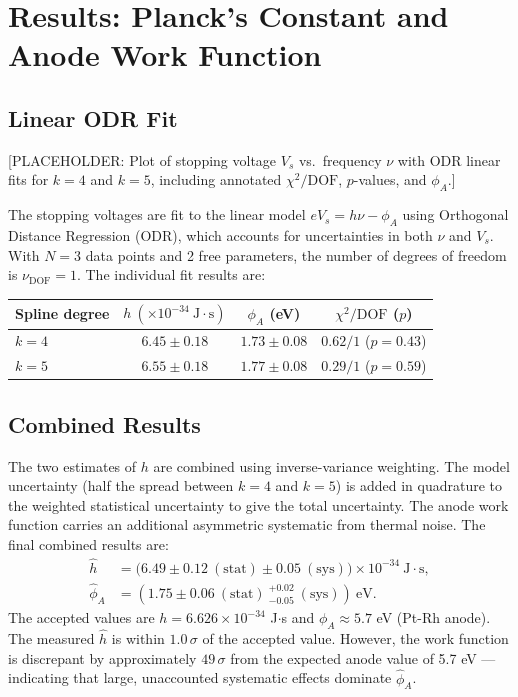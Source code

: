 \documentclass[12pt]{article}
\begin{document}
\section{Results: Planck's Constant and Anode Work Function}

\subsection{Linear ODR Fit}

[PLACEHOLDER: Plot of stopping voltage $V_s$ vs.\ frequency $\nu$ with ODR linear fits for $k=4$ and $k=5$, including annotated $\chi^2/\text{DOF}$, $p$-values, and $\phi_A$.]

The stopping voltages are fit to the linear model $eV_s = h\nu - \phi_A$ using Orthogonal Distance Regression (ODR), which accounts for uncertainties in both $\nu$ and $V_s$. With $N = 3$ data points and 2 free parameters, the number of degrees of freedom is $\nu_\text{DOF} = 1$. The individual fit results are:

\begin{center}
\begin{tabular}{lccc}
\toprule
Spline degree & $h\ (\times 10^{-34}\ \text{J}\cdot\text{s})$ & $\phi_A$ (eV) & $\chi^2/\text{DOF}$ ($p$) \\
\midrule
$k = 4$ & $6.45 \pm 0.18$ & $1.73 \pm 0.08$ & $0.62/1$ ($p = 0.43$) \\
$k = 5$ & $6.55 \pm 0.18$ & $1.77 \pm 0.08$ & $0.29/1$ ($p = 0.59$) \\
\bottomrule
\end{tabular}
\end{center}

\subsection{Combined Results}

The two estimates of $h$ are combined using inverse-variance weighting. The model uncertainty (half the spread between $k=4$ and $k=5$) is added in quadrature to the weighted statistical uncertainty to give the total uncertainty. The anode work function carries an additional asymmetric systematic from thermal noise. The final combined results are:
\begin{align}
    \hat{h} &= \bigl(6.49 \pm 0.12\ (\text{stat}) \pm 0.05\ (\text{sys})\bigr) \times 10^{-34}\ \text{J}\cdot\text{s}, \\
    \hat{\phi}_A &= \left(1.75 \pm 0.06\ (\text{stat})\ ^{+0.02}_{-0.05}\ (\text{sys})\right)\ \text{eV}.
\end{align}
The accepted values are $h = 6.626 \times 10^{-34}$ J$\cdot$s and $\phi_A \approx 5.7$ eV (Pt-Rh anode). The measured $\hat{h}$ is within $1.0\,\sigma$ of the accepted value. However, the work function is discrepant by approximately $49\,\sigma$ from the expected anode value of 5.7 eV — indicating that large, unaccounted systematic effects dominate $\hat{\phi}_A$.
\end{document}
